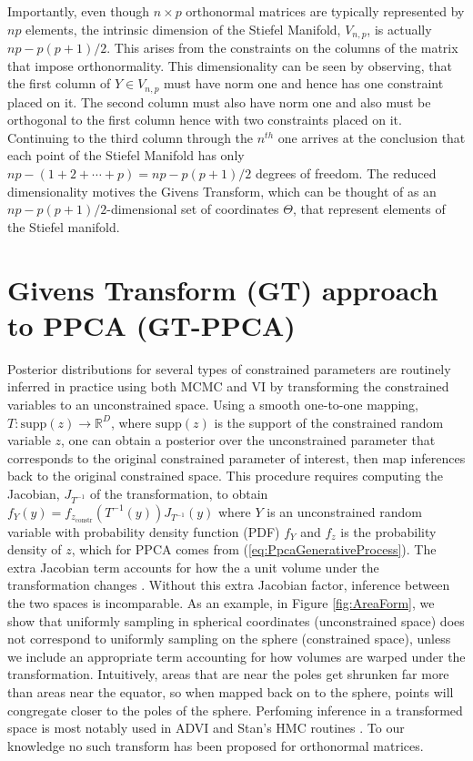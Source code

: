 \documentclass{article}
\begin{document}
Importantly, even though $n \times p$ orthonormal matrices are typically represented by $np$ elements, the intrinsic dimension of the Stiefel Manifold, $V_{n,p}$, is actually $np-p(p+1)/2$. This arises from the constraints on the columns of the matrix that impose orthonormality.  This dimensionality can be seen by observing, that the first column of $Y \in V_{n,p}$ must have norm one and hence has one constraint placed on it. The second column must also have norm one and also must be orthogonal to the first column hence with two constraints placed on it.  Continuing to the third column through the $n^{th}$ one arrives at the conclusion that each point of the Stiefel Manifold has only $np - (1+2+\cdots+p) =np-p(p+1)/2$ degrees of freedom.  The reduced dimensionality motives the Givens Transform, which can be thought of as an $np-p(p+1)/2$-dimensional set of coordinates $\Theta$, that represent elements of the Stiefel manifold.

\section{Givens Transform (GT) approach to PPCA (GT-PPCA)} \label{Givens}

Posterior distributions for several types of constrained parameters are routinely inferred in practice using both MCMC and VI by transforming the constrained variables to an unconstrained space. Using a smooth one-to-one mapping, $T: \mathrm{supp}(z) \to \mathbb{R}^D$, where $\mathrm{supp}(z)$ is the support of the constrained random variable $z$, one can obtain a posterior over the unconstrained parameter that corresponds to the original constrained parameter of interest, then map inferences back to the original constrained space. This procedure requires computing the Jacobian, $J_{T^{-1}}$ of the transformation, to obtain $f_{Y}(y) = f_{z_\mathrm{constr}}(T^{-1}(y)) J_{T^{-1}}(y)$ where $Y$ is an unconstrained random variable with probability density function (PDF) $f_Y$ and $f_{z}$ is the probability density of $z$, which for PPCA comes from (\ref{eq:PpcaGenerativeProcess}). The extra Jacobian term accounts for how the a unit volume under the transformation changes \citep{kucukelbir2014fully}. Without this extra Jacobian factor, inference between the two spaces is incomparable. As an  example, in Figure \ref{fig:AreaForm}, we show that uniformly sampling in spherical coordinates (unconstrained space) does not correspond to uniformly sampling on the sphere (constrained space), unless we include an appropriate term accounting for how volumes are warped under the transformation. Intuitively, areas that are near the poles get shrunken far more than areas near the equator, so when mapped back on to the sphere, points will congregate closer to the poles of the sphere. Perfoming inference in a transformed space is most notably used in ADVI and Stan's HMC routines \citep{carpenter2016stan, kucukelbir2014fully}. To our knowledge no such transform has been proposed for orthonormal matrices.
\end{document}
